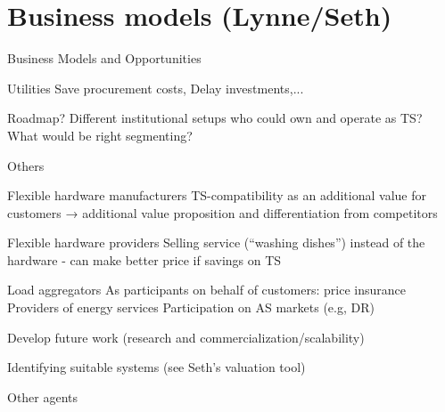 \chapter{Business models (Lynne/Seth)}

Business Models and Opportunities

Utilities
Save procurement costs, Delay investments,...

Roadmap?
Different institutional setups who could own and operate as TS?
What would be right segmenting?

Others

Flexible hardware manufacturers
TS-compatibility as an additional value for customers → additional value proposition and differentiation from competitors

Flexible hardware providers
Selling service (“washing dishes”) instead of the hardware - can make better price if savings on TS

Load aggregators
As participants on behalf of customers: price insurance
Providers of energy services
Participation on AS markets (e.g, DR)


Develop future work (research and commercialization/scalability)


Identifying suitable systems (see Seth's valuation tool)

Other agents